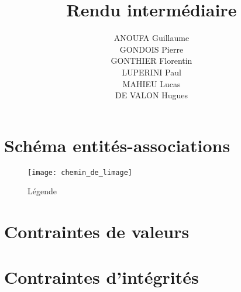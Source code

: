 \documentclass[a4paper, 10pt, french]{article}
\title{Rendu intermédiaire}
\author{
    ANOUFA Guillaume
    \\ GONDOIS Pierre
    \\ GONTHIER Florentin
    \\ LUPERINI Paul
    \\ MAHIEU Lucas
    \\ DE VALON Hugues
}
\begin{document}
\maketitle

\section{Schéma entités-associations}
{
    \begin{figure}[ht!]
        \texttt{[image: chemin\_de\_limage]}
        \centering
        \caption{Légende}
    \end{figure}

}

\section{Contraintes de valeurs}
{
	
}
\section{Contraintes d'intégrités}
{
}

\end{document}
